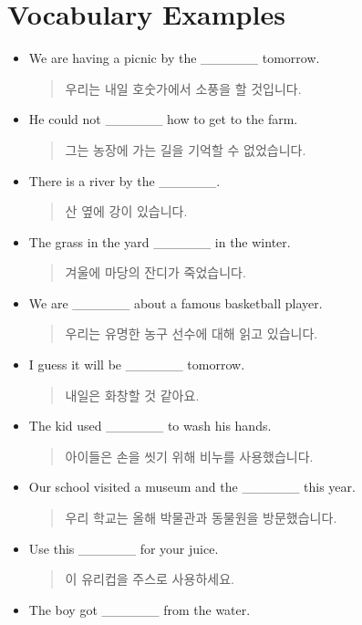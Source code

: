 \documentclass{article}
\begin{document}
\section*{Vocabulary Examples}
\begin{addmargin}[1em]{1em}
\begin{itemize}
    \item We are having a picnic by the \_\_\_\_\_\_ tomorrow.
    \begin{quote}
    우리는 내일 호숫가에서 소풍을 할 것입니다.
    \end{quote}
    \item He could not \_\_\_\_\_\_ how to get to the farm.
    \begin{quote}
    그는 농장에 가는 길을 기억할 수 없었습니다.
    \end{quote}
    \item There is a river by the \_\_\_\_\_\_.
    \begin{quote}
    산 옆에 강이 있습니다.
    \end{quote}
    \item The grass in the yard \_\_\_\_\_\_ in the winter.
    \begin{quote}
    겨울에 마당의 잔디가 죽었습니다.
    \end{quote}
    \item We are \_\_\_\_\_\_ about a famous basketball player.
    \begin{quote}
    우리는 유명한 농구 선수에 대해 읽고 있습니다.
    \end{quote}
    \item I guess it will be \_\_\_\_\_\_ tomorrow.
    \begin{quote}
    내일은 화창할 것 같아요.
    \end{quote}
    \item The kid used \_\_\_\_\_\_ to wash his hands.
    \begin{quote}
    아이들은 손을 씻기 위해 비누를 사용했습니다.
    \end{quote}
    \item Our school visited a museum and the \_\_\_\_\_\_ this year.
    \begin{quote}
    우리 학교는 올해 박물관과 동물원을 방문했습니다.
    \end{quote}
    \item Use this \_\_\_\_\_\_ for your juice.
    \begin{quote}
    이 유리컵을 주스로 사용하세요.
    \end{quote}
    \item The boy got \_\_\_\_\_\_ from the water.

\end{itemize}
\end{addmargin}
\end{document}
